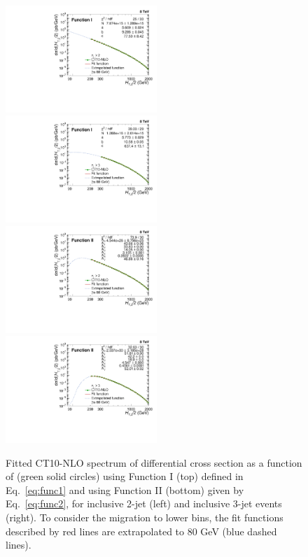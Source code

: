 \begin{figure}[ht]
  \begin{center}
    \hspace*{-5mm}\includegraphics[width=0.51\textwidth]{Plots_HT_2_150/Extrapolate_Theory_2_HT_2_150_funcI.pdf}%
    ~~\includegraphics[width=0.51\textwidth]{Plots_HT_2_150/Extrapolate_Theory_3_HT_2_150_funcI.pdf}\\
    \vspace{5mm}
    \hspace*{-5mm}\includegraphics[width=0.51\textwidth]{Plots_HT_2_150/Extrapolate_Theory_2_HT_2_150_funcII.pdf}%
    ~~\includegraphics[width=0.51\textwidth]{Plots_HT_2_150/Extrapolate_Theory_3_HT_2_150_funcII.pdf}
    \caption{Fitted CT10-NLO spectrum of differential cross section as a function of \httwo (green solid circles) using Function I (top) defined in Eq.~\ref{eq:func1} and using Function II (bottom) given by Eq.~\ref{eq:func2}, for inclusive 2-jet (left) and inclusive 3-jet events (right). To consider the migration to lower \httwo bins, the fit functions described by red lines are extrapolated to 80 GeV (blue dashed lines).}
    \label{fig:fit}
  \end{center}
\end{figure}

